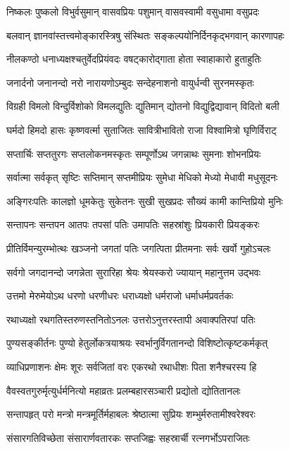 \twolineshloka
{निष्कलः पुष्कलो विभुर्वसुमान् वासवप्रियः}
{पशुमान् वासवस्वामी वसुधामा वसुप्रदः}%

\twolineshloka
{बलवान् ज्ञानवांस्तत्त्वमोङ्कारस्त्रिषु संस्थितः}
{सङ्कल्पयोनिर्दिनकृद्भगवान् कारणापहः}%

\twolineshloka
{नीलकण्ठो धनाध्यक्षश्चतुर्वेदप्रियंवदः}
{वषट्कारोद्गाता होता स्वाहाकारो हुताहुतिः}%

\twolineshloka
{जनार्दनो जनानन्दो नरो नारायणोऽम्बुदः}
{सन्देहनाशनो वायुर्धन्वी सुरनमस्कृतः}%

\twolineshloka
{विग्रही विमलो विन्दुर्विशोको विमलद्युतिः}
{द्युतिमान् द्योतनो विद्युद्विद्यावान् विदितो बली}%

\twolineshloka
{घर्मदो हिमदो हासः कृष्णवर्त्मा सुताजितः}
{सावित्रीभावितो राजा विश्वामित्रो घृणिर्विराट्}%

\twolineshloka
{सप्तार्चिः सप्ततुरगः सप्तलोकनमस्कृतः}
{सम्पूर्णोऽथ जगन्नाथः सुमनाः शोभनप्रियः}%

\twolineshloka
{सर्वात्मा सर्वकृत् सृष्टिः सप्तिमान् सप्तमीप्रियः}
{सुमेधा मेधिको मेध्यो मेधावी मधुसूदनः}%

\twolineshloka
{अङ्गिरःपतिः कालज्ञो धूमकेतुः सुकेतनः}
{सुखी सुखप्रदः सौख्यं कामी कान्तिप्रियो मुनिः}%

\twolineshloka
{सन्तापनः सन्तपन आतपः तपसां पतिः}
{उमापतिः सहस्रांशुः प्रियकारी प्रियङ्करः}%

\twolineshloka
{प्रीतिर्विमन्युरम्भोत्थः खञ्जनो जगतां पतिः}
{जगत्पिता प्रीतमनाः सर्वः खर्वो गुहोऽचलः}%

\twolineshloka
{सर्वगो जगदानन्दो जगन्नेता सुरारिहा}
{श्रेयः श्रेयस्करो ज्यायान् महानुत्तम उद्भवः}%

\twolineshloka
{उत्तमो मेरुमेयोऽथ धरणो धरणीधरः}
{धराध्यक्षो धर्मराजो धर्माधर्मप्रवर्तकः}%

\twolineshloka
{रथाध्यक्षो रथगतिस्तरुणस्तनितोऽनलः}
{उत्तरोऽनुत्तरस्तापी अवाक्पतिरपां पतिः}%

\twolineshloka
{पुण्यसङ्कीर्तनः पुण्यो हेतुर्लोकत्रयाश्रयः}
{स्वर्भानुर्विगतानन्दो विशिष्टोत्कृष्टकर्मकृत्}%

\twolineshloka
{व्याधिप्रणाशनः क्षेमः शूरः सर्वजितां वरः}
{एकरथो रथाधीशः पिता शनैश्चरस्य हि}%

\twolineshloka
{वैवस्वतगुरुर्मृत्युर्धर्मनित्यो महाव्रतः}
{प्रलम्बहारसञ्चारी प्रद्योतो द्योतितानलः}%

\twolineshloka
{सन्तापहृत् परो मन्त्रो मन्त्रमूर्तिर्महाबलः}
{श्रेष्ठात्मा सुप्रियः शम्भुर्मरुतामीश्वरेश्वरः}%

\twolineshloka
{संसारगतिविच्छेता संसारार्णवतारकः}
{सप्तजिह्वः सहस्रार्ची रत्नगर्भोऽपराजितः}%

